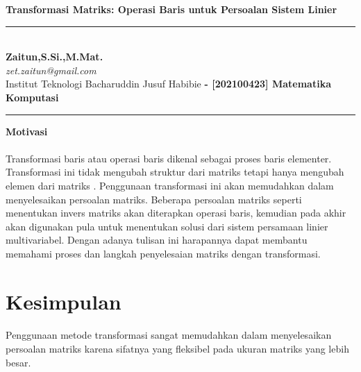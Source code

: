 \documentclass{article}   %
\newcommand{\judul}{Transformasi Matriks: Operasi Baris untuk Persoalan Sistem Linier}
\newcommand{\nama}{Zaitun,S.Si.,M.Mat.}
\newcommand{\matkul}{[202100423] Matematika Komputasi}
\newcommand{\asosiasi}{Institut Teknologi Bacharuddin Jusuf Habibie}
\begin{document}
\thispagestyle{empty}
\begin{center}
    \vspace{.4cm}
    \textsf{\textbf { \large \judul}}
\end{center}
\vspace{.4cm}
\hrule
	\textsf{\\
		\textbf{\nama} \hspace{\fill}
		\textit{\large }\\ [0.7ex]
		\textit{zet.zaitun@gmail.com} \hspace{\fill} \textbf{}\\ [0.7ex]
		\asosiasi \hspace{\fill} \textbf{- \matkul }} \\
	\hrule
\vspace{.4cm}
\begin{center}
\textbf{\Large Motivasi}
\end{center}
\paragraph*{} 
Transformasi baris atau operasi baris dikenal sebagai proses baris elementer. Transformasi ini tidak mengubah struktur dari matriks tetapi hanya mengubah elemen dari matriks \textbf{\cite{zz}}. Penggunaan transformasi ini akan memudahkan dalam menyelesaikan persoalan matriks. Beberapa persoalan matriks seperti menentukan invers matriks akan diterapkan operasi baris, kemudian pada akhir akan digunakan pula untuk menentukan solusi dari sistem persamaan linier multivariabel. Dengan adanya tulisan ini harapannya dapat membantu memahami proses dan langkah penyelesaian matriks dengan transformasi.




\section{Kesimpulan}
\paragraph*{} Penggunaan metode transformasi sangat memudahkan dalam menyelesaikan persoalan matriks karena sifatnya yang fleksibel pada ukuran matriks yang lebih besar. 



\end{document}
